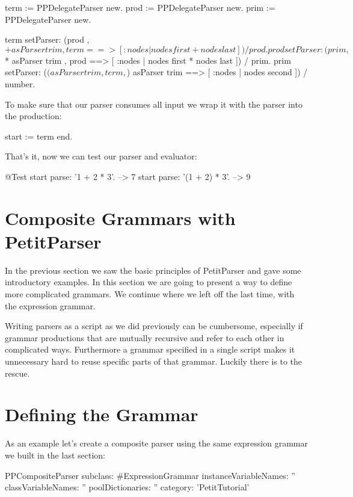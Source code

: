 \documentclass[a4paper,10pt,twoside]{book}
\begin{document}
\begin{code}{}
term := PPDelegateParser new.
prod := PPDelegateParser new.
prim := PPDelegateParser new.
 
term setParser: (prod , $+ asParser trim , term ==> [ :nodes | nodes first + nodes last ]) / prod.
prod setParser: (prim , $* asParser trim , prod ==> [ :nodes | nodes first * nodes last ]) / prim.
prim setParser: ($( asParser trim , term , $) asParser trim ==> [ :nodes | nodes second ]) / number.
\end{code}

To make sure that our parser consumes all input we wrap it with the
 parser into the  production:

\begin{code}{}
start := term end.
\end{code}

That's it, now we can test our parser and evaluator:

\begin{code}{@Test}
start parse: '1 + 2 * 3'.       --> 7
start parse: '(1 + 2) * 3'.     --> 9
\end{code}

\section{Composite Grammars with PetitParser}

In the previous section we saw the basic principles of PetitParser and
gave some introductory examples. In this section we are going to
present a way to define more complicated grammars. We continue where
we left off the last time, with the expression grammar.

Writing parsers as a script as we did previously can be cumbersome,
especially if grammar productions that are mutually recursive and
refer to each other in complicated ways. Furthermore a grammar
specified in a single script makes it unnecessary hard to reuse
specific parts of that grammar. Luckily there is
 to the rescue.

\section{Defining the Grammar}

As an example let's create a composite parser using the same
expression grammar we built in the last section:

\begin{code}{}
PPCompositeParser subclass: #ExpressionGrammar
   instanceVariableNames: ''
   classVariableNames: ''
   poolDictionaries: ''
   category: 'PetitTutorial'
\end{code}
\end{document}
